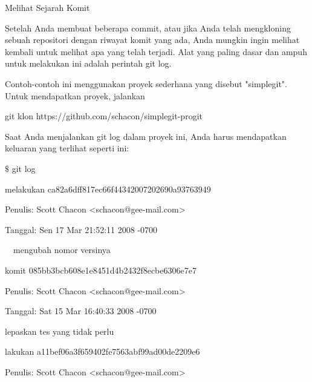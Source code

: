 \noindent 
Melihat Sejarah Komit \par
\noindent 
 \hspace*{0.5in} Setelah Anda membuat beberapa commit, atau jika Anda telah mengkloning sebuah repositori dengan riwayat komit yang ada, Anda mungkin ingin melihat kembali untuk melihat apa yang telah terjadi. Alat yang paling dasar dan ampuh untuk melakukan ini adalah perintah git log. \par
\noindent 
Contoh-contoh ini menggunakan proyek sederhana yang disebut "simplegit". Untuk mendapatkan proyek, jalankan \par
\noindent 
git klon https://github.com/schacon/simplegit-progit \par
\noindent 
Saat Anda menjalankan git log dalam proyek ini, Anda harus mendapatkan keluaran yang terlihat seperti ini: \par
\vspace{12pt}
\noindent 
 \hspace*{0.5in}  $  \$  $ git log \par
\noindent 
 \hspace*{0.5in} melakukan ca82a6dff817ec66f44342007202690a93763949 \par
\noindent 
 \hspace*{0.5in} Penulis: Scott Chacon <schacon@gee-mail.com> \par
\noindent 
 \hspace*{0.5in} Tanggal: Sen 17 Mar 21:52:11 2008 -0700 \par
\vspace{12pt}
\noindent 
 \hspace*{0.5in}  $  $ $  $ $  $ $  $mengubah nomor versinya \par
\vspace{12pt}
\noindent 
 \hspace*{0.5in} komit 085bb3bcb608e1e8451d4b2432f8ecbe6306e7e7 \par
\noindent 
 \hspace*{0.5in} Penulis: Scott Chacon <schacon@gee-mail.com> \par
\noindent 
 \hspace*{0.5in} Tanggal: Sat 15 Mar 16:40:33 2008 -0700 \par
\noindent 
lepaskan tes yang tidak perlu \par
\noindent 
 \hspace*{0.5in} lakukan a11bef06a3f659402fe7563abf99ad00de2209e6 \par
\noindent 
 \hspace*{0.5in} Penulis: Scott Chacon <schacon@gee-mail.com> \par
